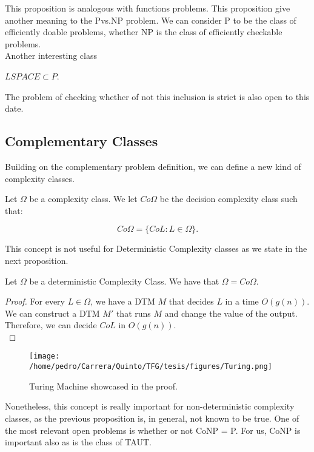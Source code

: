 This proposition is analogous with functions problems. This proposition give another meaning to the Pvs.NP problem. We can consider P to be the class of efficiently doable problems, whether NP is the class of efficiently checkable problems.\\
 Another interesting class 


\begin{corollary}
  $LSPACE \subset P$.
\end{corollary}

The problem of checking whether of not this inclusion is strict is also open to this date.


\subsection{Complementary Classes}

Building on the complementary problem definition, we can define a new kind of complexity classes.

\begin{definition}
  Let $\Omega$ be a complexity class. We let $Co\Omega$ be the decision complexity class such that:

  $$Co\Omega = \{CoL : L\in \Omega\}.$$
\end{definition}

This concept is not useful for Deterministic Complexity classes as we state in the next proposition.
\begin{proposition}
Let $\Omega$ be a deterministic Complexity Class. We have that $\Omega = Co\Omega$.
\end{proposition}
\begin{proof}
  For every $L\in \Omega$, we have a DTM $M$ that decides $L$ in a time $O(g(n))$. We can construct a DTM $M'$ that runs $M$ and change the value of the output. Therefore, we can decide $CoL$ in $O(g(n))$. \\
\end{proof}

\begin{figure}[h]
  \begin{center}
    \texttt{[image: /home/pedro/Carrera/Quinto/TFG/tesis/figures/Turing.png]}
  \end{center}
  \caption{Turing Machine showcased in the proof.}
\end{figure}


Nonetheless, this concept is really important for non-deterministic complexity classes, as the previous proposition is, in general, not known to be true. One of the most relevant open problems is whether or not CoNP = P. For us, CoNP is important also as is the class of TAUT.



